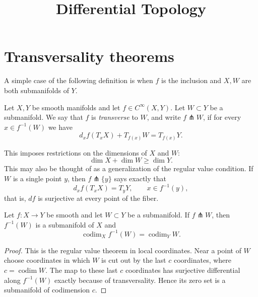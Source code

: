 
\usepackage{amssymb}

\newcommand{\rightlooparrow}{\mathbin{
\vbox{\openup-10.25pt\halign{\hss$##$\hss\cr
\circ\cr\longrightarrow\cr}}
}}



\title{Differential Topology}
\maketitle

\label{section-phantom}

\tableofcontents

\section{Transversality theorems}
\label{section-transversality-theorems}

\noindent
A simple case of the following definition is
when $f$ is the inclusion and $X,W$ are both
submanifolds of $Y$.

\begin{definition}
\label{definition-transversal-map}
Let $X,Y$ be smooth manifolds and let
$f \in C^\infty(X,Y)$.
Let $W \subset Y$ be a submanifold.
We say that $f$ is {\it transverse} to $W$,
and write $f \pitchfork W$, if for every
$x \in f^{-1}(W)$ we have
$$
d_xf(T_xX)+T_{f(x)}W=T_{f(x)}Y.
$$
\end{definition}

\noindent
This imposes restrictions on the dimensions
of $X$ and $W$:
$$
\dim X+\dim W \geq \dim Y.
$$
This may also be thought of as a
generalization of the regular value
condition.  If $W$ is a single point $y$,
then $f \pitchfork \{y\}$ says exactly that
$$
d_xf(T_xX)=T_yY,
\qquad x \in f^{-1}(y),
$$
that is, $df$ is surjective at every point of
the fiber.

\begin{theorem}
\label{theorem-preimage-transverse}
Let $f:X \to Y$ be smooth and let
$W \subset Y$ be a submanifold.  If
$f \pitchfork W$, then $f^{-1}(W)$ is a
submanifold of $X$ and
$$
\operatorname{codim}_X f^{-1}(W)
=
\operatorname{codim}_Y W.
$$
\end{theorem}

\begin{proof}
This is the regular value theorem in local
coordinates.  Near a point of $W$ choose
coordinates in which $W$ is cut out by the
last $c$ coordinates, where
$c=\operatorname{codim}W$.  The map to these
last $c$ coordinates has surjective
differential along $f^{-1}(W)$ exactly because
of transversality.  Hence its zero set is a
submanifold of codimension $c$.
\end{proof}

